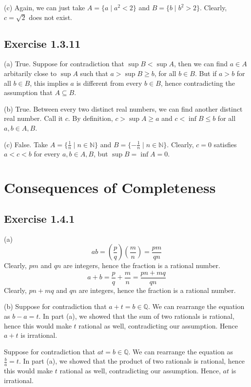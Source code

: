 \documentclass{book}
\begin{document}
\noindent
(c)
Again, we can just take $A = \{ a \mid a^2 < 2 \}$ and $B = \{ b \mid b^2 > 2 \}$. Clearly, $c = \sqrt{2}$ does not exist.

\subsection*{Exercise 1.3.11}
(a)
True. Suppose for contradiction that $\sup B < \sup A$, then we can find $a \in A$ arbitarily close to $\sup A$ such that $a > \sup B \geq b$, for all $b \in B$. But if $a > b$ for all $b \in B$, this implies $a$ is different from every $b \in B$, hence contradicting the assumption that $A \subseteq B$.

\noindent
(b)
True. Between every two distinct real numbers, we can find another distinct real number. Call it $c$. By definition, $c > \sup A \geq a$ and $c < \inf B \leq b$ for all $a, b \in A, B$.

\noindent
(c)
False. Take $A = \{ \frac{1}{n} \mid n \in \mathbb{N} \}$ and $B = \{ -\frac{1}{n} \mid n \in \mathbb{N} \}$. Clearly, $c = 0$ satisfies $a < c < b$ for every $a, b \in A, B$, but $\sup B = \inf A = 0$.

\section{Consequences of Completeness}

\subsection*{Exercise 1.4.1}
(a)
$$ab = \left(\frac{p}{q}\right) \left(\frac{m}{n}\right) = \frac{pm}{qn}$$
Clearly, $pm$ and $qn$ are integers, hence the fraction is a rational number.
$$a + b = \frac{p}{q} + \frac{m}{n} = \frac{pn + mq}{qn}$$
Clearly, $pn + mq$ and $qn$ are integers, hence the fraction is a rational number.

\noindent
(b)
Suppose for contradiction that $a + t = b \in \mathbb{Q}$. We can rearrange the equation as $b - a = t$. In part (a), we showed that the sum of two rationals is rational, hence this would make $t$ rational as well, contradicting our assumption. Hence $a + t$ is irrational.

Suppose for contradiction that $at = b \in \mathbb{Q}$. We can rearrange the equation as $\frac{b}{a} = t$. In part (a), we showed that the product of two rationals is rational, hence this would make $t$ rational as well, contradicting our assumption. Hence, $at$ is irrational.
\end{document}
